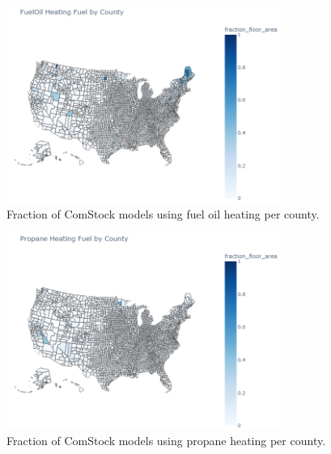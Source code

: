 \begin{figure}
  \centering
  \includegraphics[width=0.8\textwidth]{figures/map_fueloil.png}
  \caption[Fraction of ComStock models using fuel oil heating/water heating per county]{Fraction of ComStock models using fuel oil heating per county.}
  \label{fig:map_fueloil}
\end{figure}

\begin{figure}
  \centering
  \includegraphics[width=0.8\textwidth]{figures/map_propane.png}
  \caption[Fraction of ComStock models using propane heating/water heating per county]{Fraction of ComStock models using propane heating per county.}
  \label{fig:map_propane}
\end{figure}

